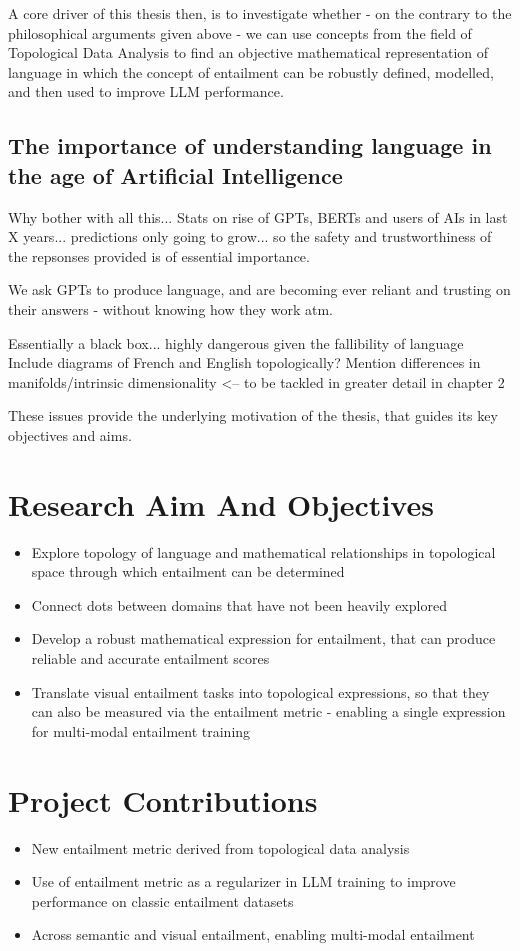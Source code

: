 \documentclass[12pt,twoside]{report}
\begin{document}
A core driver of this thesis then, is to investigate whether - on the contrary to the philosophical arguments given above - we can use concepts from the field of Topological Data Analysis to find an objective mathematical representation of language in which the concept of entailment can be robustly defined, modelled, and then used to improve LLM performance.


\subsection{The importance of understanding language in the age of Artificial Intelligence}
Why bother with all this...
Stats on rise of GPTs, BERTs and users of AIs in last X years... predictions only going to grow... so the safety and trustworthiness of the repsonses provided is of essential importance. 

We ask GPTs to produce language, and are becoming ever reliant and trusting on their answers - without knowing how they work atm. 

Essentially a black box... highly dangerous given the fallibility of language 
Include diagrams of French and English topologically? Mention differences in manifolds/intrinsic dimensionality <-- to be tackled in greater detail in chapter 2

These issues provide the underlying motivation of the thesis, that guides its key objectives and aims.

\section{Research Aim And Objectives}

\begin{itemize}
    \item Explore topology of language and mathematical relationships in topological space through which entailment can be determined
    \item Connect dots between domains that have not been heavily explored
    \item Develop a robust mathematical expression for entailment, that can produce reliable and accurate entailment scores 
    \item Translate visual entailment tasks into topological expressions, so that they can also be measured via the entailment metric - enabling a single expression for multi-modal entailment training 
\end{itemize}


\section{Project Contributions}
\begin{itemize}
    \item New entailment metric derived from topological data analysis
    \item Use of entailment metric as a regularizer in LLM training to improve performance on classic entailment datasets
    \item Across semantic and visual entailment, enabling multi-modal entailment
\end{itemize}
\end{document}
